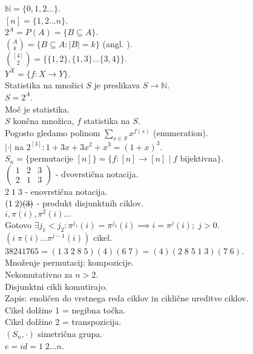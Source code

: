 \documentclass[a4paper, 12pt]{book}
\newcommand{\msout}[1]{\text{\sout{\ensuremath{#1}}}}
\theoremstyle{definition}
\theoremstyle{remark}
\newcommand{\N}{\mathbb{N}}
\begin{document}
$\N = \{0, 1, 2 \dots\}$. \\
$[n] = \{1, 2 \dots n\}$. \\
$2^A = P(A) = \{B \subseteq A\}$. \\
$\binom{A}{k} = \{B \subseteq A: |B| = k\}$  (angl. ). \\
$\binom{[4]}{2} = \{\{1,2\}, \{1,3\} \ldots \{3,4\}\}$. \\
$Y^X = \{f: X \to Y\}$. \\
Statistika na množici $S$ je preslikava $S \to \N$. \\
$S = 2^A$. \\
Moč je statistika. \\
$S$ končna množica, $f$ statistika na $S$. \\
Pogosto gledamo polinom $\sum_{s \in S} x^{f(s)}$ (enumeration). \\
$|\cdot|$ na $2^{[3]}: 1 + 3 x + 3 x^2 + x^3 = (1+x)^3$. \\
$S_n = \{$permutacije $[n]\} = \{f: [n] \to [n] \mid f $ bijektivna$\}$. \\
$\begin{pmatrix}1 & 2 & 3 \\ 2 & 1 & 3\end{pmatrix}$ - dvovrstična notacija. \\
$2 \; 1 \; 3$ - enovrstična notacija. \\
$(1 \; 2) \msout{(3)}$ - produkt disjunktnih ciklov. \\
$i, \pi(i), \pi^2(i) \dots$ \\
Gotovo $\exists j_1 < j_2: \pi^{j_1}(i) = \pi^{j_2}(i) \implies i = \pi^j(i); \; j > 0$. \\
$(i \; \pi(i) \dots \pi^{j-1}(i))$ cikel. \\
$38241765 = (1 \; 3 \; 2 \; 8 \; 5) (4) (6 \; 7) = (4) (2 \; 8 \; 5 \; 1 \; 3) (7 \; 6)$. \\
Množenje permutacij: kompozicije. \\
Nekomutativno za $n > 2$. \\
Disjunktni cikli komutirajo. \\
Zapis: enoličen do vrstnega reda ciklov in ciklične ureditve ciklov. \\
Cikel dolžine 1 = negibna točka. \\
Cikel dolžine 2 = transpozicija. \\
$(S_n, \cdot)$ simetrična grupa. \\
$e = id = 1 \; 2 \dots n$. \\
\end{document}
